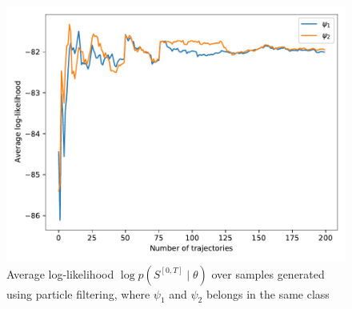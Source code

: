 \begin{figure}[H]
	\begin{center}
		\includegraphics[width=.65\textwidth]{figures/equivalence_classes/llh_particleFilter_same_class}
		\caption{Average log-likelihood $ \log p(S^{[0,T]} \mid \theta) $ over samples generated using particle filtering, where $ \psi_1 $ and $ \psi_2 $ belongs in the same class}
		\label{fig:llh_particleFIilter_same_class}
	\end{center}
\end{figure} 
